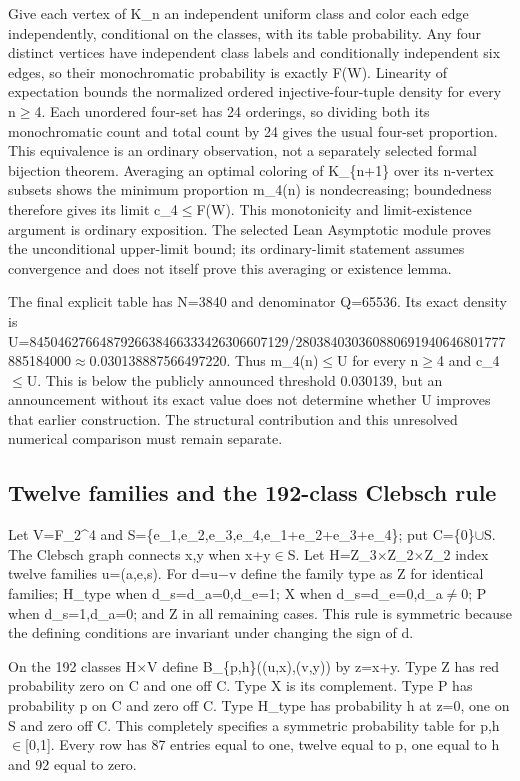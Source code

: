 \documentclass[11pt,a4paper]{article}
\begin{document}
Give each vertex of K\_n an independent uniform class and color each edge independently, conditional on the classes, with its table probability. Any four distinct vertices have independent class labels and conditionally independent six edges, so their monochromatic probability is exactly F(W). Linearity of expectation bounds the normalized ordered injective-four-tuple density for every n\ensuremath{\geq}4. Each unordered four-set has 24 orderings, so dividing both its monochromatic count and total count by 24 gives the usual four-set proportion. This equivalence is an ordinary observation, not a separately selected formal bijection theorem. Averaging an optimal coloring of K\_\{n+1\} over its n-vertex subsets shows the minimum proportion m\_4(n) is nondecreasing; boundedness therefore gives its limit c\_4\ensuremath{\leq}F(W). This monotonicity and limit-existence argument is ordinary exposition. The selected Lean Asymptotic module proves the unconditional upper-limit bound; its ordinary-limit statement assumes convergence and does not itself prove this averaging or existence lemma.

The final explicit table has N=3840 and denominator Q=65536. Its exact density is U=8450462766487926638466333426306607129/280384030360880691940646801777885184000\ensuremath{\approx}0.030138887566497220. Thus m\_4(n)\ensuremath{\leq}U for every n\ensuremath{\geq}4 and c\_4\ensuremath{\leq}U. This is below the publicly announced threshold 0.030139, but an announcement without its exact value does not determine whether U improves that earlier construction. The structural contribution and this unresolved numerical comparison must remain separate.

\subsection{Twelve families and the 192-class Clebsch rule}
Let V=F\_2\textasciicircum{}4 and S=\{e\_1,e\_2,e\_3,e\_4,e\_1+e\_2+e\_3+e\_4\}; put C=\{0\}\ensuremath{\cup}S. The Clebsch graph connects x,y when x+y\ensuremath{\in}S. Let H=Z\_3\ensuremath{\times}Z\_2\ensuremath{\times}Z\_2 index twelve families u=(a,e,s). For d=u\ensuremath{-}v define the family type as Z for identical families; H\_type when d\_s=d\_a=0,d\_e=1; X when d\_s=d\_e=0,d\_a\ensuremath{\neq}0; P when d\_s=1,d\_a=0; and Z in all remaining cases. This rule is symmetric because the defining conditions are invariant under changing the sign of d.

On the 192 classes H\ensuremath{\times}V define B\_\{p,h\}((u,x),(v,y)) by z=x+y. Type Z has red probability zero on C and one off C. Type X is its complement. Type P has probability p on C and zero off C. Type H\_type has probability h at z=0, one on S and zero off C. This completely specifies a symmetric probability table for p,h\ensuremath{\in}[0,1]. Every row has 87 entries equal to one, twelve equal to p, one equal to h and 92 equal to zero.
\end{document}
